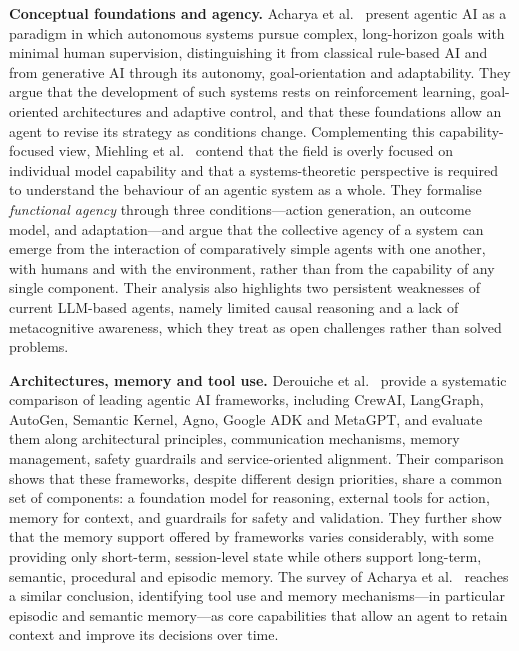 \documentclass[12pt,a4paper]{report}
\begin{document}
\noindent\textbf{Conceptual foundations and agency.}
Acharya et al.~\cite{ref2} present agentic AI as a paradigm in which autonomous systems pursue complex, long-horizon goals with minimal human supervision, distinguishing it from classical rule-based AI and from generative AI through its autonomy, goal-orientation and adaptability. They argue that the development of such systems rests on reinforcement learning, goal-oriented architectures and adaptive control, and that these foundations allow an agent to revise its strategy as conditions change. Complementing this capability-focused view, Miehling et al.~\cite{ref7} contend that the field is overly focused on individual model capability and that a systems-theoretic perspective is required to understand the behaviour of an agentic system as a whole. They formalise \emph{functional agency} through three conditions---action generation, an outcome model, and adaptation---and argue that the collective agency of a system can emerge from the interaction of comparatively simple agents with one another, with humans and with the environment, rather than from the capability of any single component. Their analysis also highlights two persistent weaknesses of current LLM-based agents, namely limited causal reasoning and a lack of metacognitive awareness, which they treat as open challenges rather than solved problems.

\noindent\textbf{Architectures, memory and tool use.}
Derouiche et al.~\cite{ref8} provide a systematic comparison of leading agentic AI frameworks, including CrewAI, LangGraph, AutoGen, Semantic Kernel, Agno, Google ADK and MetaGPT, and evaluate them along architectural principles, communication mechanisms, memory management, safety guardrails and service-oriented alignment. Their comparison shows that these frameworks, despite different design priorities, share a common set of components: a foundation model for reasoning, external tools for action, memory for context, and guardrails for safety and validation. They further show that the memory support offered by frameworks varies considerably, with some providing only short-term, session-level state while others support long-term, semantic, procedural and episodic memory. The survey of Acharya et al.~\cite{ref2} reaches a similar conclusion, identifying tool use and memory mechanisms---in particular episodic and semantic memory---as core capabilities that allow an agent to retain context and improve its decisions over time.
\end{document}
